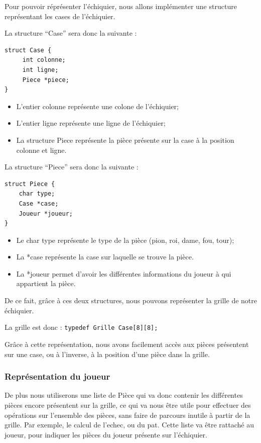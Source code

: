 \documentclass[12pt]{article}
\begin{document}
Pour pouvoir réprésenter l'échiquier, nous allons implémenter une
structure représentant les cases de l'échiquier.

La structure ``Case'' sera donc la suivante :

\begin{lstlisting}
struct Case {
     int colonne;
     int ligne;
     Piece *piece;
}
\end{lstlisting}

\begin{itemize}
\itemsep1pt\parskip0pt
\item
  L'entier colonne représente une colone de l'échiquier;
\item
  L'entier ligne représente une ligne de l'échiquier;
\item
  La structure Piece représente la pièce présente sur la case à la
  position colonne et ligne.
\end{itemize}

La structure ``Piece'' sera donc la suivante :

\begin{lstlisting}
struct Piece {
    char type;
    Case *case;
    Joueur *joueur;
}
\end{lstlisting}

\begin{itemize}
\itemsep1pt\parskip0pt
\item
  Le char type représente le type de la pièce (pion, roi, dame, fou,
  tour);
\item
  La *case représente la case sur laquelle se trouve la pièce.
\item
  La *joueur permet d'avoir les différentes informations du joueur à qui
  appartient la pièce.
\end{itemize}

De ce fait, grâce à ces deux structures, nous pouvons représenter la
grille de notre échiquier.

La grille est donc : \lstinline!typedef Grille Case[8][8];!

Grâce à cette représentation, nous avons facilement accès aux pièces
présentent sur une case, ou à l'inverse, à la position d'une pièce dans
la grille.

\subsubsection{Représentation du
joueur}\label{repruxe9sentation-du-joueur}

De plus nous utiliserons une liste de Pièce qui va donc contenir les
différentes pièces encore présentent sur la grille, ce qui va nous être
utile pour effectuer des opérations sur l'ensemble des pièces, sans
faire de parcours inutile à partir de la grille. Par exemple, le calcul
de l'echec, ou du pat. Cette liste va être rattaché au joueur, pour
indiquer les pièces du joueur présente sur l'échiquier.
\end{document}
